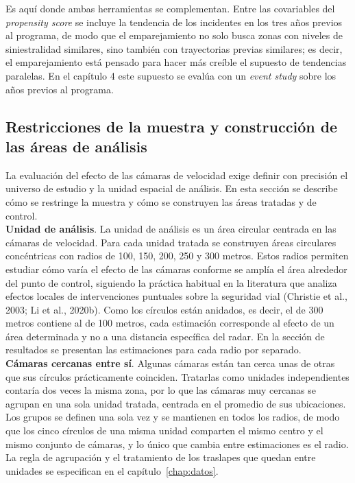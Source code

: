 Es aquí donde ambas herramientas se complementan. Entre las covariables del \textit{propensity score} se incluye la tendencia de los incidentes en los tres años previos al programa, de modo que el emparejamiento no solo busca zonas con niveles de siniestralidad similares, sino también con trayectorias previas similares; es decir, el emparejamiento está pensado para hacer más creíble el supuesto de tendencias paralelas. En el capítulo 4 este supuesto se evalúa con un \emph{event study} sobre los años previos al programa.\\

\subsection{Restricciones de la muestra y construcción de las áreas de análisis}
\noindent La evaluación del efecto de las cámaras de velocidad exige definir con precisión el universo de estudio y la unidad espacial de análisis. En esta sección se describe cómo se restringe la muestra y cómo se construyen las áreas tratadas y de control.\\

\textbf{Unidad de análisis}. La unidad de análisis es un área circular centrada en las cámaras de velocidad. Para cada unidad tratada se construyen áreas circulares concéntricas con radios de 100, 150, 200, 250 y 300 metros. Estos radios permiten estudiar cómo varía el efecto de las cámaras conforme se amplía el área alrededor del punto de control, siguiendo la práctica habitual en la literatura que analiza efectos locales de intervenciones puntuales sobre la seguridad vial (Christie et al., 2003; Li et al., 2020b). Como los círculos están anidados, es decir, el de 300 metros contiene al de 100 metros, cada estimación corresponde al efecto de un área determinada y no a una distancia específica del radar. En la sección de resultados se presentan las estimaciones para cada radio por separado.\\

\textbf{Cámaras cercanas entre sí}. Algunas cámaras están tan cerca unas de otras que sus círculos prácticamente coinciden. Tratarlas como unidades independientes contaría dos veces la misma zona, por lo que las cámaras muy cercanas se agrupan en una sola unidad tratada, centrada en el promedio de sus ubicaciones. Los grupos se definen una sola vez y se mantienen en todos los radios, de modo que los cinco círculos de una misma unidad comparten el mismo centro y el mismo conjunto de cámaras, y lo único que cambia entre estimaciones es el radio. La regla de agrupación y el tratamiento de los traslapes que quedan entre unidades se especifican en el capítulo~\ref{chap:datos}.\\

